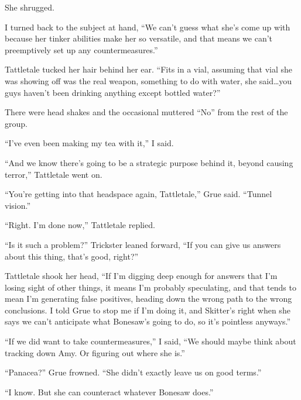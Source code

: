 She shrugged.



I turned back to the subject at hand, ``We can't guess what she's come up with because her tinker abilities make her so versatile, and that means we can't preemptively set up any countermeasures.''



Tattletale tucked her hair behind her ear.  ``Fits in a vial, assuming that vial she was showing off was the real weapon, something to do with water, she said\ldots you guys haven't been drinking anything except bottled water?''



There were head shakes and the occasional muttered ``No'' from the rest of the group.



``I've even been making my tea with it,'' I said.



``And we know there's going to be a strategic purpose behind it, beyond causing terror,'' Tattletale went on.



``You're getting into that headspace again, Tattletale,'' Grue said.  ``Tunnel vision.''



``Right.  I'm done now,'' Tattletale replied.



``Is it such a problem?'' Trickster leaned forward, ``If you can give us answers about this thing, that's good, right?''



Tattletale shook her head, ``If I'm digging deep enough for answers that I'm losing sight of other things, it means I'm probably speculating, and that tends to mean I'm generating false positives, heading down the wrong path to the wrong conclusions.  I told Grue to stop me if I'm doing it, and Skitter's right when she says we can't anticipate what Bonesaw's going to do, so it's pointless anyways.''



``If we did want to take countermeasures,'' I said, ``We should maybe think about tracking down Amy.  Or figuring out where she is.''



``Panacea?''  Grue frowned.  ``She didn't exactly leave us on good terms.''



``I know.  But she can counteract whatever Bonesaw does.''




